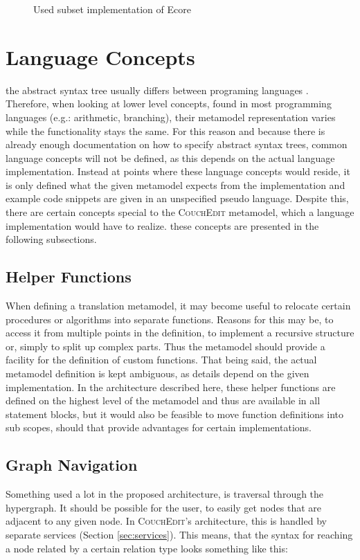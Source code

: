 \begin{figure}
  \centering
  
  \caption{Used subset implementation of Ecore}
  \label{fig:csd-abstractsyntax}
\end{figure}


\section{Language Concepts}
\label{sec:language-concepts}
the abstract syntax tree usually differs between programing languages . Therefore, when looking at lower level concepts, found in most programming languages (e.g.: arithmetic, branching), their metamodel representation varies while the functionality stays the same. For this reason and because there is already enough documentation on how to specify abstract syntax trees, common language concepts will not be defined, as this depends on the actual language implementation. Instead at points where these language concepts would reside, it is only defined what the given metamodel expects from the implementation and example code snippets are given in an unspecified pseudo language. Despite this, there are certain concepts special to the \textsc{CouchEdit} metamodel, which a language implementation would have to realize. these concepts are presented in the following subsections.


\subsection{Helper Functions}
When defining a translation metamodel, it may become useful to relocate certain procedures or algorithms into separate functions. Reasons for this may be, to access it from multiple points in the definition, to implement a recursive structure or, simply to split up complex parts. Thus the metamodel should provide a facility for the definition of custom functions. That being said, the actual metamodel definition is kept ambiguous, as details depend on the given implementation. In the architecture described here, these helper functions are defined on the highest level of the metamodel and thus are available in all statement blocks, but it would also be feasible to move function definitions into sub scopes, should that provide advantages for certain implementations.

\subsection{Graph Navigation}
\label{sec:abstraction}
Something used a lot in the proposed architecture, is traversal through the hypergraph. It should be possible for the user, to easily get nodes that are adjacent to any given node. In \textsc{CouchEdit}'s architecture, this is handled by separate services (Section \ref{sec:services}). This means, that the syntax for reaching a node related by a certain relation type looks something like this:

